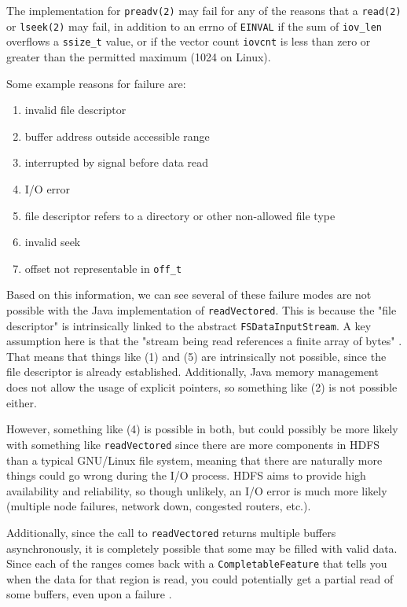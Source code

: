 \documentclass[letterpaper,twocolumn]{article}
\begin{document}
The implementation for \texttt{preadv(2)} may fail for any of the reasons that a \texttt{read(2)} or \texttt{lseek(2)} may fail, in addition to an errno of \texttt{EINVAL} if the sum of \texttt{iov\_len} overflows a \texttt{ssize\_t} value, or if the vector count \texttt{iovcnt} is less than zero or greater than the permitted maximum (1024 on Linux). \cite{6}

Some example reasons for failure are:

\begin{enumerate}[nosep]
	\item invalid file descriptor
	\item buffer address outside accessible range
	\item interrupted by signal before data read
	\item I/O error
	\item file descriptor refers to a directory or other non-allowed file type
	\item invalid seek
	\item offset not representable in \texttt{off\_t}
\end{enumerate}

Based on this information, we can see several of these failure modes are not possible with the Java implementation of \texttt{readVectored}. This is because the "file descriptor" is intrinsically linked to the abstract \texttt{FSDataInputStream}. A key assumption here is that the "stream being read references a finite array of bytes" \cite{5}. That means that things like (1) and (5) are intrinsically not possible, since the file descriptor is already established. Additionally, Java memory management does not allow the usage of explicit pointers, so something like (2) is not possible either. 

However, something like (4) is possible in both, but could possibly be more likely with something like \texttt{readVectored} since there are more components in HDFS than a typical GNU/Linux file system, meaning that there are naturally more things could go wrong during the I/O process. HDFS aims to provide high availability and reliability, so though unlikely, an I/O error is much more likely (multiple node failures, network down, congested routers, etc.).

Additionally, since the call to \texttt{readVectored} returns multiple buffers asynchronously, it is completely possible that some may be filled with valid data. Since each of the ranges comes back with a \texttt{CompletableFeature} that tells you when the data for that region is read, you could potentially get a partial read of some buffers, even upon a failure \cite{5}.
\end{document}
